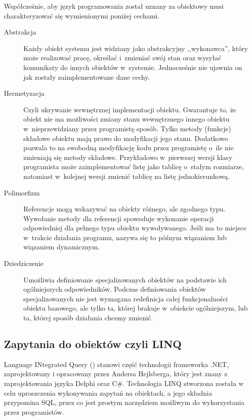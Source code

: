 Współcześnie, aby język programowania został uznany za obiektowy musi charakteryzować się wymienionymi poniżej cechami.
\begin{description}
	\item[Abstrakcja] Każdy obiekt systemu jest widziany jako abstrakcyjny ,,wykonawca'', który może realizować pracę, określać i~zmieniać swój stan oraz wysyłać komunikaty do innych obiektów w~systemie. Jednocześnie nie ujawnia on jak zostały zaimplementowane dane cechy.
	\item[Hermetyzacja] Czyli ukrywanie wewnętrznej implementacji obiektu. Gwarantuje to, że obiekt nie ma możliwości zmiany stanu wewnętrznego innego obiektu w~nieprzewidziany przez programistę sposób. Tylko metody (funkcje) składowe obiektu mają prawo do modyfikacji jego stanu. Dodatkowo pozwala to na swobodną modyfikację kodu przez programistę o~ile nie zmieniają się metody składowe. Przykładowo w~pierwszej wersji klasy programista może zaimplementować listę jako tablicę o~stałym rozmiarze, natomiast w~kolejnej wersji zmienić tablicę na listę jednokierunkową.
	\item[Polimorfizm] Referencje mogą wskazywać na obiekty różnego, ale zgodnego typu. Wywołanie metody dla referencji spowoduje wykonanie operacji odpowiedniej dla pełnego typu obiektu wywoływanego. Jeśli ma to miejsce w~trakcie działania programu, nazywa się to późnym wiązaniem lub wiązaniem dynamicznym.
	\item[Dziedziczenie] Umożliwia definiowanie specjalizowanych obiektów na podstawie ich ogólniejszych odpowiedników. Podczas definiowania obiektów specjalizowanych nie jest wymagana redefinicja całej funkcjonalności obiektu bazowego, ale tylko ta, której brakuje w~obiekcie ogólniejszym, lub ta, której sposób działania chcemy zmienić.
	
\end{description}

\subsection{Zapytania do obiektów czyli LINQ\label{sec:linq}}
Language INtegrated Query () stanowi część technologii frameworka .NET, zaprojektowany i opracowany przez Andersa Hejlsberga, który jest znany z zaprojektowania języka Delphi oraz C\#. Technologia LINQ stworzona została w celu uproszczenia wykonywania zapytań na obiektach, a jego składnia przypomina SQL, przez co jest prostym narzędziem możliwym do wykorzystania przez programistów.

